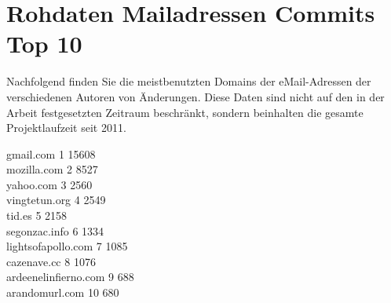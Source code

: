 \section*{Rohdaten Mailadressen Commits Top  10}

Nachfolgend finden Sie die meistbenutzten Domains der eMail-Adressen der verschiedenen Autoren von Änderungen. Diese Daten sind nicht auf den in der Arbeit festgesetzten Zeitraum beschränkt, sondern beinhalten die gesamte Projektlaufzeit seit 2011.

\noindent
gmail.com 1 15608 \\
mozilla.com 2 8527 \\
yahoo.com 3 2560 \\
vingtetun.org 4 2549 \\
tid.es 5 2158 \\
segonzac.info 6 1334 \\
lightsofapollo.com 7 1085 \\
cazenave.cc 8 1076 \\
ardeenelinfierno.com 9 688 \\
arandomurl.com 10 680 \\